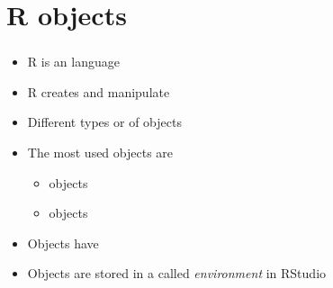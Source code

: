 \documentclass[8pt]{beamer}
\begin{document}



\section{R objects}


\bgroup
{}
\begin{frame}[plain]{}
\begin{center}
\color{white}{\Huge\insertsection}
\end{center}
\end{frame}
\egroup


\begin{frame}
\frametitle{\insertsection}

\begin{itemize}
\item R is an {\color{blue}{object-oriented}} language
\item R creates and manipulate {\color{blue}{objects}}
\item Different types or {\color{blue}{classes}} of objects
\item The most used objects are
    \begin{itemize}
    \item {\color{blue}{Data}} objects    	  
    \item {\color{blue}{Function}} objects
    \end{itemize}
\item Objects have {\color{blue}{attributes}}
\item Objects are stored in a {\color{blue}{workspace}} called \textit{environment} in RStudio
\end{itemize}

\end{frame}

\end{document}
